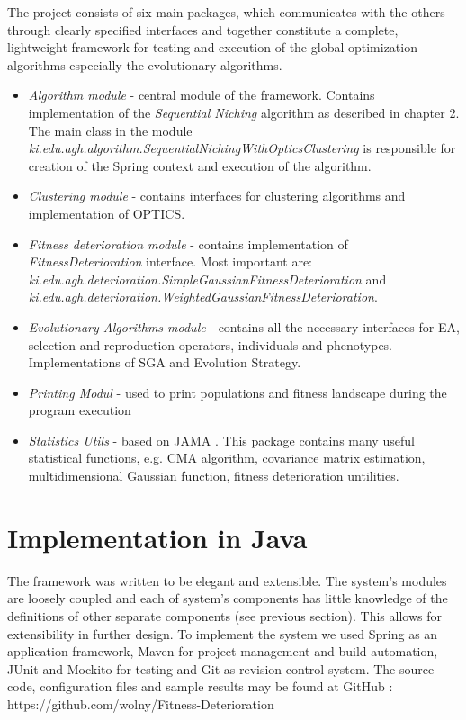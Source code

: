 The project consists of six main packages, which communicates with the
others through clearly specified interfaces and together constitute a
complete, lightweight framework for testing and execution of the global 
optimization algorithms especially the evolutionary algorithms.
\begin{itemize}
  \item \textit{Algorithm module} - central module of the framework. Contains
  implementation of the \textit{Sequential Niching} algorithm as described in
  chapter 2. The main class in the module
  \textit{ki.edu.agh.algorithm.SequentialNichingWithOpticsClustering} is
  responsible for creation of the Spring context and execution of the algorithm. 
  \item \textit{Clustering module} - contains interfaces for clustering
  algorithms and implementation of OPTICS.
  \item \textit{Fitness deterioration module} - contains implementation of
  \textit{FitnessDeterioration} interface. Most important are:
  \textit{ki.edu.agh.deterioration.SimpleGaussianFitnessDeterioration} and 
  \textit{ki.edu.agh.deterioration.WeightedGaussianFitnessDeterioration}.
  \item \textit{Evolutionary Algorithms module} - contains all the necessary
  interfaces for EA, selection and reproduction operators, individuals and
  phenotypes. Implementations of SGA and Evolution Strategy. 
  \item \textit{Printing Modul} - used to print populations and fitness
  landscape during the program execution
  \item \textit{Statistics Utils} - based on JAMA \cite{jama}. This package
  contains many useful statistical functions, e.g. CMA algorithm, covariance
  matrix estimation, multidimensional Gaussian function, fitness deterioration
  untilities.
\end{itemize}

\section{Implementation in Java}
The framework was written to be elegant and extensible. The system's 
modules are loosely coupled and each of system's components has little knowledge of the definitions 
of other separate components (see previous section). This allows for
extensibility in further design. To implement the system we used Spring
\cite{spring} as an application framework, Maven \cite{maven} for project
management and build automation, JUnit \cite{junit} and Mockito \cite{mockito}
for testing and Git \cite{git} as revision control system. 
The source code, configuration files and sample results may be found at 
GitHub \cite{github}: https://github.com/wolny/Fitness-Deterioration


